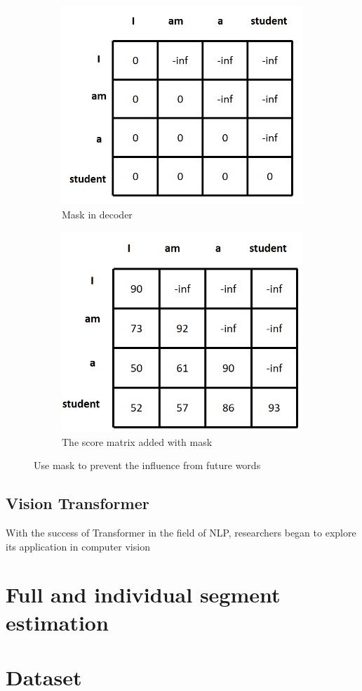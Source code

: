   \begin{figure}[htbp]
		\centering
		\begin{subfigure}[b]{0.5\textwidth}
			\centering
			\includegraphics[width=0.9\linewidth]{example_images/mask}
			\caption{Mask in decoder}
			\label{Mask in decoder}
		\end{subfigure}
		\hfill
		\begin{subfigure}[b]{0.5\textwidth}
			\centering
			\includegraphics[width=0.9\linewidth]{example_images/mask1}
			\caption{The score matrix added with mask}
			\label{The score matrix added with mask}
		\end{subfigure}
		\caption{Use mask to prevent the influence from future words}
		\label{Use mask to prevent the influence from future words}
	\end{figure}
\subsection{Vision Transformer}
  With the success of Transformer in the field of NLP, researchers began to explore its application in computer vision
\section{Full and individual segment estimation}

\section{Dataset}